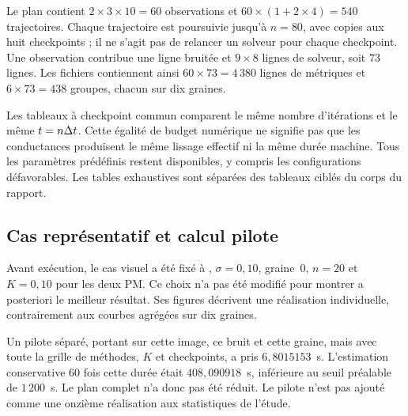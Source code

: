 Le plan contient $2\times3\times10=60$ observations et
$60\times(1+2\times4)=540$ trajectoires. Chaque trajectoire est poursuivie
jusqu'à $n=80$, avec copies aux huit checkpoints ; il ne s'agit pas de
relancer un solveur pour chaque checkpoint. Une observation contribue
une ligne bruitée et $9\times8$ lignes de solveur, soit $73$ lignes.
Les fichiers contiennent ainsi $60\times73=4\,380$ lignes de métriques
et $6\times73=438$ groupes, chacun sur dix graines.

Les tableaux à checkpoint commun comparent le même nombre d'itérations
et le même $t=n\Delta t$. Cette égalité de budget numérique ne signifie pas
que les conductances produisent le même lissage effectif ni la même durée
machine. Tous les paramètres prédéfinis restent disponibles, y compris
les configurations défavorables. Les tables exhaustives sont séparées
des tableaux ciblés du corps du rapport.

\subsection{Cas représentatif et calcul pilote}

Avant exécution, le cas visuel a été fixé à
, $\sigma=0{,}10$, graine~$0$, $n=20$ et
$K=0{,}10$ pour les deux PM. Ce choix n'a pas été modifié pour montrer
a posteriori le meilleur résultat. Ses figures décrivent une réalisation
individuelle, contrairement aux courbes agrégées sur dix graines.

Un pilote séparé, portant sur cette image, ce bruit et cette graine, mais
avec toute la grille de méthodes, $K$ et checkpoints, a pris
$6{,}8015153$~s. L'estimation conservative $60$ fois cette durée était
$408{,}090918$~s, inférieure au seuil préalable de $1\,200$~s. Le plan
complet n'a donc pas été réduit. Le pilote n'est pas ajouté comme une
onzième réalisation aux statistiques de l'étude.
